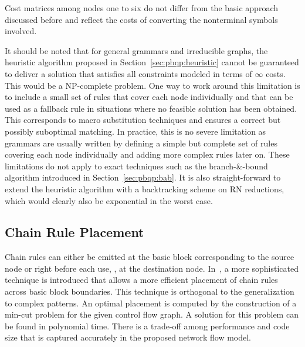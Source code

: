 Cost matrices among nodes one to six do not differ from the basic
approach discussed before and reflect the costs of converting the
nonterminal symbols involved.

It should be noted that for general grammars and irreducible graphs,
the heuristic algorithm proposed in Section~\ref{sec:pbqp:heuristic}
cannot be guaranteed to deliver a solution that satisfies all
constraints modeled in terms of $\infty$ costs. This would be a
NP-complete problem. One way to work around this limitation is to
include a small set of rules that cover each node individually and
that can be used as a fallback rule in situations where no feasible
solution has been obtained. This corresponds to macro substitution
techniques and ensures a correct but possibly suboptimal matching. In
practice, this is no severe limitation as grammars are usually written
by defining a simple but complete set of rules covering each node
individually and adding more complex rules later on. These limitations
do not apply to exact techniques such as the branch-\&-bound algorithm
introduced in Section~\ref{sec:pbqp:bab}. It is also straight-forward
to extend the heuristic algorithm with a backtracking scheme on RN
reductions, which would clearly also be exponential in the worst case.

\subsection{Chain Rule Placement}
\label{sec:chain_rule_placement}
Chain rules can either be emitted at the basic block corresponding to
the source node or right before each use, \ie, at the destination
node. In~\cite{1269857}, a more sophisticated technique is introduced
that allows a more efficient placement of chain rules across basic
block boundaries. This technique is orthogonal to the generalization
to complex patterns. An optimal placement is computed by the
construction of a min-cut problem for the given control flow graph. A
solution for this problem can be found in polynomial time. There is a
trade-off among performance and code size that is captured accurately
in the proposed network flow model.

